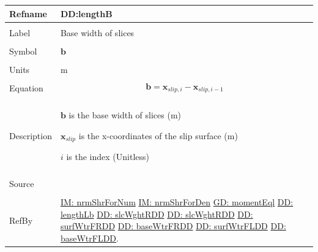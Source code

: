 \documentclass[12pt]{article}
\begin{document}
\noindent \begin{minipage}{\textwidth}
\begin{tabular}{p{} p{}}
\toprule \textbf{Refname} & \textbf{DD:lengthB}
\label{DD:lengthB}
\\ \midrule \\
Label & Base width of slices
\\ \midrule \\
Symbol & $\mathbf{b}$
\\ \midrule \\
Units & m
\\ \midrule \\
Equation & \begin{displaymath}
           \mathbf{b}={\mathbf{x}_{slip,i}}-{\mathbf{x}_{slip,i-1}}
           \end{displaymath}
\\ \midrule \\
Description & \begin{symbDescription}
              \item{$\mathbf{b}$ is the base width of slices (m)}
              \item{${\mathbf{x}_{slip}}$ is the x-coordinates of the slip surface (m)}
              \item{$i$ is the index (Unitless)}
              \end{symbDescription}
\\ \midrule \\
Source & \cite{fredlund1977}
\\ \midrule \\
RefBy & \hyperref[IM:nrmShrForNum]{IM: nrmShrForNum} \hyperref[IM:nrmShrForDen]{IM: nrmShrForDen} \hyperref[GD:momentEql]{GD: momentEql} \hyperref[DD:lengthLb]{DD: lengthLb} \hyperref[DD:slcWghtRDD]{DD: slcWghtRDD} \hyperref[DD:slcWghtRDD]{DD: slcWghtRDD} \hyperref[DD:surfWtrFRDD]{DD: surfWtrFRDD} \hyperref[DD:baseWtrFRDD]{DD: baseWtrFRDD} \hyperref[DD:surfWtrFLDD]{DD: surfWtrFLDD} \hyperref[DD:baseWtrFLDD]{DD: baseWtrFLDD}.
\\ \bottomrule \end{tabular}
\end{minipage}
\par~
\end{document}

